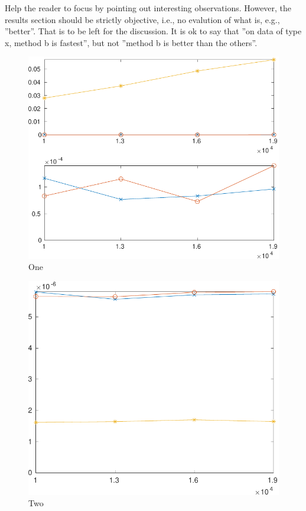 \documentclass[10pt, titlepage, oneside, a4paper]{article}
\begin{document}
Help the reader to focus by pointing out interesting observations.
However, the results section should be strictly objective, i.e., no
evalution of what is, e.g., ''better''. That is to be left for the
discussion. It is ok to say that ''on data of type x, method b is
fastest'', but not ''method b is better than the others''.


\begin{figure}
\begin{center}
\includegraphics[width=0.75\hsize]{fig1.pdf}
\end{center}
\caption{One}
\label{fig:fig1}
\end{figure}

\begin{figure}
\begin{center}
\includegraphics[width=0.75\hsize]{fig2.pdf}
\end{center}
\caption{Two}
\label{fig:fig2}
\end{figure}
\end{document}
